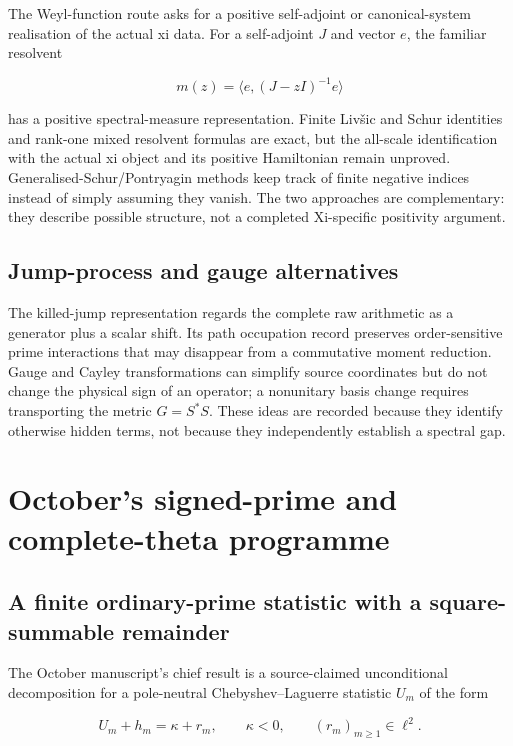\documentclass[
  10pt,
  a4paper,
  10pt,
  oneside,
  openany]{book}
\begin{document}
The Weyl-function route asks for a positive self-adjoint or
canonical-system realisation of the actual xi data. For a self-adjoint
\(J\) and vector \(e\), the familiar resolvent

\[
m(z)=\langle e,(J-zI)^{-1}e\rangle
\tag{S6.4}\label{eq:S6.4}
\]

has a positive spectral-measure representation. Finite Liv\v{s}ic and
Schur identities and rank-one mixed resolvent formulas are exact, but
the all-scale identification with the actual xi object and its positive
Hamiltonian remain unproved. Generalised-Schur/Pontryagin methods keep
track of finite negative indices instead of simply assuming they vanish.
The two approaches are complementary: they describe possible structure,
not a completed Xi-specific positivity argument.

\subsection{Jump-process and gauge
alternatives}\label{jump-process-and-gauge-alternatives}

The killed-jump representation regards the complete raw arithmetic as a
generator plus a scalar shift. Its path occupation record preserves
order-sensitive prime interactions that may disappear from a commutative
moment reduction. Gauge and Cayley transformations can simplify source
coordinates but do not change the physical sign of an operator; a
nonunitary basis change requires transporting the metric \(G=S^*S\).
These ideas are recorded because they identify otherwise hidden terms,
not because they independently establish a spectral gap.

\section{October's signed-prime and complete-theta
programme}\label{octobers-signed-prime-and-complete-theta-programme}

\subsection{A finite ordinary-prime statistic with a square-summable
remainder}\label{a-finite-ordinary-prime-statistic-with-a-square-summable-remainder}

The October manuscript's chief result is a source-claimed unconditional
decomposition for a pole-neutral Chebyshev--Laguerre statistic \(U_m\)
of the form

\[
U_m+h_m=\kappa+r_m,\qquad \kappa<0,\qquad (r_m)_{m\ge1}\in\ell^2.
\tag{S7.1}\label{eq:S7.1}
\]
\end{document}
